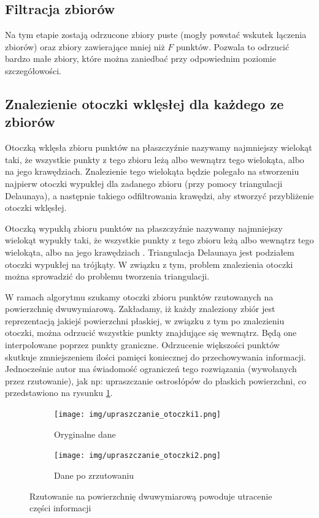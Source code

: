 \subsection{Filtracja zbiorów}

Na tym etapie zostają odrzucone zbiory puste (mogły powstać wskutek łączenia zbiorów) oraz zbiory zawierające
mniej niż $F$ punktów. Pozwala to odrzucić bardzo małe zbiory, które można zaniedbać przy odpowiednim
poziomie szczegółowości.

\subsection{Znalezienie otoczki wklęsłej dla każdego ze zbiorów}

Otoczką wklęsła zbioru punktów na płaszczyźnie nazywamy najmniejszy wielokąt taki, że wszystkie punkty z tego
zbioru leżą albo wewnątrz tego wielokąta, albo na jego krawędziach. Znalezienie tego wielokąta będzie polegało na
stworzeniu najpierw otoczki wypukłej dla zadanego zbioru (przy pomocy triangulacji Delaunaya), a następnie takiego
odfiltrowania krawędzi, aby stworzyć przybliżenie otoczki wklęsłej.

Otoczką wypukłą zbioru punktów na płaszczyźnie nazywamy najmniejszy wielokąt wypukły taki, że wszystkie punkty z tego
zbioru leżą albo wewnątrz tego wielokąta, albo na jego krawędziach \cite{website:OtoczkaTriangulacja}.
Triangulacja Delaunaya jest podziałem otoczki wypukłej na trójkąty. W związku z tym, problem znalezienia otoczki
można sprowadzić do problemu tworzenia triangulacji.

W ramach algorytmu szukamy otoczki zbioru punktów rzutowanych na powierzchnię dwuwymiarową.
Zakładamy, iż każdy znaleziony zbiór jest reprezentacją jakiejś powierzchni płaskiej,
w związku z tym po znalezieniu otoczki, można odrzucić wszystkie punkty znajdujące się wewnątrz.
Będą one interpolowane poprzez punkty graniczne.
Odrzucenie większości punktów skutkuje zmniejszeniem ilości pamięci koniecznej do przechowywania informacji. Jednocześnie autor ma
świadomość ograniczeń tego rozwiązania (wywołanych przez rzutowanie), jak np: upraszczanie ostrosłópów do płaskich powierzchni, co przedstawiono
na rysunku \ref{fig:upraszczanie_otoczki}.

\begin{figure}[h!]
    \centering
    \begin{subfigure}[b]{0.3\textwidth}
        \texttt{[image: img/upraszczanie\_otoczki1.png]}
        \caption {Oryginalne dane}
    \end{subfigure}
    \quad
    \begin{subfigure}[b]{0.3\textwidth}
        \texttt{[image: img/upraszczanie\_otoczki2.png]}
        \caption {Dane po zrzutowaniu}
    \end{subfigure}%
    \caption{Rzutowanie na powierzchnię dwuwymiarową powoduje utracenie części informacji}
    \label{fig:upraszczanie_otoczki}
\end{figure}

